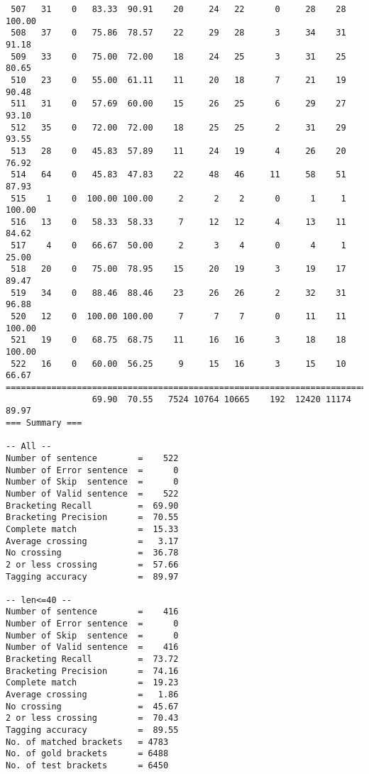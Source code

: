 \begin{verbatim}
 507   31    0   83.33  90.91    20     24   22      0     28    28   100.00
 508   37    0   75.86  78.57    22     29   28      3     34    31    91.18
 509   33    0   75.00  72.00    18     24   25      3     31    25    80.65
 510   23    0   55.00  61.11    11     20   18      7     21    19    90.48
 511   31    0   57.69  60.00    15     26   25      6     29    27    93.10
 512   35    0   72.00  72.00    18     25   25      2     31    29    93.55
 513   28    0   45.83  57.89    11     24   19      4     26    20    76.92
 514   64    0   45.83  47.83    22     48   46     11     58    51    87.93
 515    1    0  100.00 100.00     2      2    2      0      1     1   100.00
 516   13    0   58.33  58.33     7     12   12      4     13    11    84.62
 517    4    0   66.67  50.00     2      3    4      0      4     1    25.00
 518   20    0   75.00  78.95    15     20   19      3     19    17    89.47
 519   34    0   88.46  88.46    23     26   26      2     32    31    96.88
 520   12    0  100.00 100.00     7      7    7      0     11    11   100.00
 521   19    0   68.75  68.75    11     16   16      3     18    18   100.00
 522   16    0   60.00  56.25     9     15   16      3     15    10    66.67
============================================================================
                 69.90  70.55   7524 10764 10665    192  12420 11174    89.97
=== Summary ===

-- All --
Number of sentence        =    522
Number of Error sentence  =      0
Number of Skip  sentence  =      0
Number of Valid sentence  =    522
Bracketing Recall         =  69.90
Bracketing Precision      =  70.55
Complete match            =  15.33
Average crossing          =   3.17
No crossing               =  36.78
2 or less crossing        =  57.66
Tagging accuracy          =  89.97

-- len<=40 --
Number of sentence        =    416
Number of Error sentence  =      0
Number of Skip  sentence  =      0
Number of Valid sentence  =    416
Bracketing Recall         =  73.72
Bracketing Precision      =  74.16
Complete match            =  19.23
Average crossing          =   1.86
No crossing               =  45.67
2 or less crossing        =  70.43
Tagging accuracy          =  89.55
No. of matched brackets   = 4783
No. of gold brackets      = 6488
No. of test brackets      = 6450

\end{verbatim}

\normalsize


